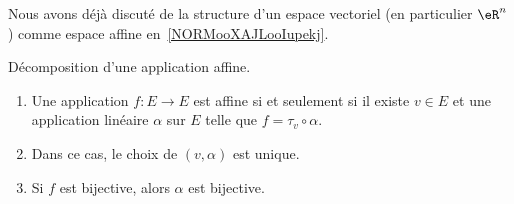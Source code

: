 Nous avons déjà discuté de la structure d'un espace vectoriel (en particulier \( \eR^n\)) comme espace affine en~\ref{NORMooXAJLooIupekj}.


\begin{lemma}\label{LEMooZZAIooOMiayy}
	Décomposition d'une application affine.
	\begin{enumerate}
		\item       \label{ITEMooSJBFooYHURto}
		      Une application \( f\colon E\to E\) est affine si et seulement si il existe \( v\in E\) et une application linéaire \( \alpha\) sur \( E\) telle que \( f=\tau_v\circ\alpha\).
		\item       \label{ITEMooPYEOooKIesYm}
		      Dans ce cas, le choix de \( (v,\alpha)\) est unique.
		\item       \label{ITEMooHIAUooRxfTqx}
		      Si \( f\) est bijective, alors \( \alpha\) est bijective.
	\end{enumerate}
\end{lemma}

